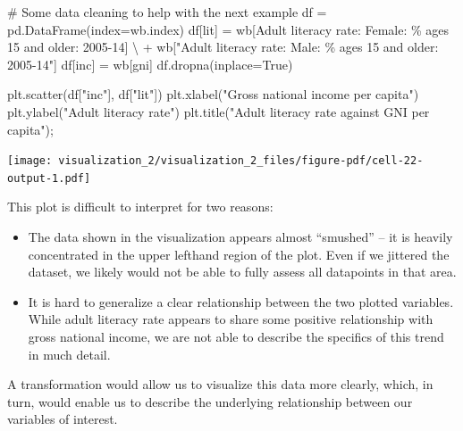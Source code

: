 \documentclass[
  letterpaper,
  DIV=11,
  numbers=noendperiod]{scrreprt}
\newenvironment{Shaded}{\begin{snugshade}}{\end{snugshade}}
\newcommand{\CommentTok}[1]{\textcolor[rgb]{0.37,0.37,0.37}{#1}}
\newcommand{\NormalTok}[1]{\textcolor[rgb]{0.00,0.23,0.31}{#1}}
\newcommand{\OperatorTok}[1]{\textcolor[rgb]{0.37,0.37,0.37}{#1}}
\newcommand{\StringTok}[1]{\textcolor[rgb]{0.13,0.47,0.30}{#1}}
\newcommand{\VariableTok}[1]{\textcolor[rgb]{0.07,0.07,0.07}{#1}}
\providecommand{\tightlist}{%
  \setlength{\itemsep}{0pt}\setlength{\parskip}{0pt}}\usepackage{longtable,booktabs,array}
\begin{document}
\begin{Shaded}
\begin{Highlighting}[]
\CommentTok{\# Some data cleaning to help with the next example}
\NormalTok{df }\OperatorTok{=}\NormalTok{ pd.DataFrame(index}\OperatorTok{=}\NormalTok{wb.index)}
\NormalTok{df[}\StringTok{\textquotesingle{}lit\textquotesingle{}}\NormalTok{] }\OperatorTok{=}\NormalTok{ wb[}\StringTok{\textquotesingle{}Adult literacy rate: Female: \% ages 15 and older: 2005{-}14\textquotesingle{}}\NormalTok{] }\OperatorTok{\textbackslash{}}
            \OperatorTok{+}\NormalTok{ wb[}\StringTok{"Adult literacy rate: Male: \% ages 15 and older: 2005{-}14"}\NormalTok{]}
\NormalTok{df[}\StringTok{\textquotesingle{}inc\textquotesingle{}}\NormalTok{] }\OperatorTok{=}\NormalTok{ wb[}\StringTok{\textquotesingle{}gni\textquotesingle{}}\NormalTok{]}
\NormalTok{df.dropna(inplace}\OperatorTok{=}\VariableTok{True}\NormalTok{)}

\NormalTok{plt.scatter(df[}\StringTok{"inc"}\NormalTok{], df[}\StringTok{"lit"}\NormalTok{])}
\NormalTok{plt.xlabel(}\StringTok{"Gross national income per capita"}\NormalTok{)}
\NormalTok{plt.ylabel(}\StringTok{"Adult literacy rate"}\NormalTok{)}
\NormalTok{plt.title(}\StringTok{"Adult literacy rate against GNI per capita"}\NormalTok{)}\OperatorTok{;}
\end{Highlighting}
\end{Shaded}

\texttt{[image: visualization\_2/visualization\_2\_files/figure-pdf/cell-22-output-1.pdf]}

This plot is difficult to interpret for two reasons:

\begin{itemize}
\tightlist
\item
  The data shown in the visualization appears almost ``smushed'' -- it
  is heavily concentrated in the upper lefthand region of the plot. Even
  if we jittered the dataset, we likely would not be able to fully
  assess all datapoints in that area.
\item
  It is hard to generalize a clear relationship between the two plotted
  variables. While adult literacy rate appears to share some positive
  relationship with gross national income, we are not able to describe
  the specifics of this trend in much detail.
\end{itemize}

A transformation would allow us to visualize this data more clearly,
which, in turn, would enable us to describe the underlying relationship
between our variables of interest.
\end{document}
